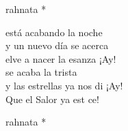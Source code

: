 \begin{cancion}
\begin{chorus}
		rahnata * \jump\\
	\end{chorus}%
	 está acabando la noche\\
	\jump
y un nuevo día se acerca\\
	elve a nacer la esanza ¡Ay!\\
	se acaba la trista\\
	y las estrellas ya nos di ¡Ay!\\
	Que el Salor ya est ce!\jump\\
	\begin{chorus}%
		rahnata * \jump\\
	\end{chorus}%
\end{cancion}%
